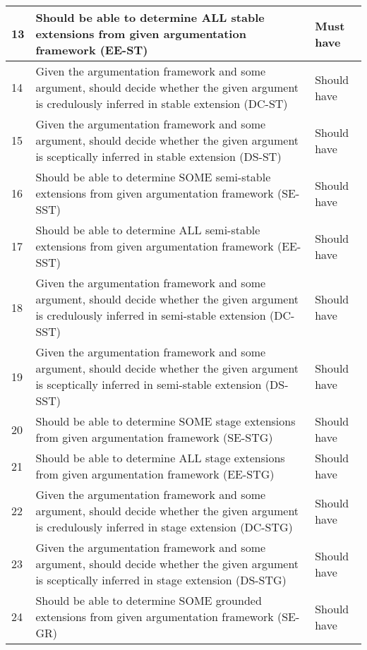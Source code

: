 \begin{center}
\begin{longtable}{| p{} | p{} | p{} |}
13 & Should be able to determine ALL stable extensions from given argumentation framework (EE-ST)                                                            & Must have \\ \hline
14 & Given the argumentation framework and some argument, should decide whether the given argument is credulously inferred in stable extension (DC-ST)       & Should have \\ \hline
15 & Given the argumentation framework and some argument, should decide whether the given argument is sceptically inferred in stable extension (DS-ST)       & Should have \\ \hline
16 & Should be able to determine SOME semi-stable extensions from given argumentation framework (SE-SST)                                                     & Should have \\ \hline
17 & Should be able to determine ALL semi-stable extensions from given argumentation framework (EE-SST)                                                      & Should have \\ \hline
18 & Given the argumentation framework and some argument, should decide whether the given argument is credulously inferred in semi-stable extension (DC-SST) & Should have \\ \hline
19 & Given the argumentation framework and some argument, should decide whether the given argument is sceptically inferred in semi-stable extension (DS-SST) & Should have \\ \hline
20 & Should be able to determine SOME stage extensions from given argumentation framework (SE-STG)                                                           & Should have \\ \hline
21 & Should be able to determine ALL stage extensions from given argumentation framework (EE-STG)                                                            & Should have \\ \hline
22 & Given the argumentation framework and some argument, should decide whether the given argument is credulously inferred in stage extension (DC-STG)       & Should have \\ \hline
23 & Given the argumentation framework and some argument, should decide whether the given argument is sceptically inferred in stage extension (DS-STG)       & Should have \\ \hline
24 & Should be able to determine SOME grounded extensions from given argumentation framework (SE-GR)                                                         & Should have \\ \hline

\end{longtable}
\end{center}
